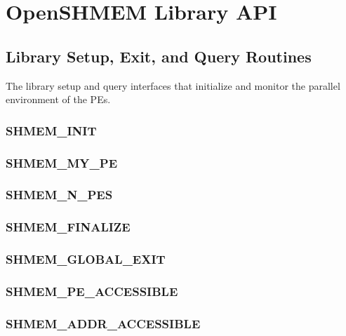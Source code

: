 \documentclass[10pt]{book}
\begin{document}
\clearpage



\section{OpenSHMEM Library API}\label{sec:openshmem_library_api}

\subsection{Library Setup, Exit, and Query Routines}
The library setup and query interfaces that initialize and monitor the parallel
environment of the \acp{PE}.

\subsubsection{\textbf{SHMEM\_INIT}}\label{subsec:shmem_init}


\subsubsection{\textbf{SHMEM\_MY\_PE}}\label{subsec:shmem_my_pe}


\subsubsection{\textbf{SHMEM\_N\_PES}}\label{subsec:shmem_n_pes}


\subsubsection{\textbf{SHMEM\_FINALIZE}}\label{subsec:shmem_finalize}


\subsubsection{\textbf{SHMEM\_GLOBAL\_EXIT}}\label{subsec:shmem_global_exit}


\subsubsection{\textbf{SHMEM\_PE\_ACCESSIBLE}}\label{subsec:shmem_pe_accessible}


\subsubsection{\textbf{SHMEM\_ADDR\_ACCESSIBLE}}\label{subsec:shmem_addr_accessible}

\end{document}

